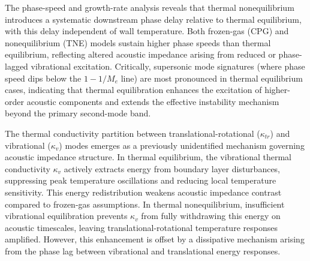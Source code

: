 The phase-speed and growth-rate analysis reveals that thermal nonequilibrium introduces a systematic downstream phase delay relative to thermal equilibrium, with this delay independent of wall temperature. Both frozen-gas (\gls{CPG}) and nonequilibrium (\gls{TNE}) models sustain higher phase speeds than thermal equilibrium, reflecting altered acoustic impedance arising from reduced or phase-lagged vibrational excitation. Critically, supersonic mode signatures (where phase speed dips below the $1 - 1/M_e$ line) are most pronounced in thermal equilibrium cases, indicating that thermal equilibration enhances the excitation of higher-order acoustic components and extends the effective instability mechanism beyond the primary second-mode band.

The thermal conductivity partition between translational-rotational ($\kappa_{tr}$) and vibrational ($\kappa_v$) modes emerges as a previously unidentified mechanism governing acoustic impedance structure. In thermal equilibrium, the vibrational thermal conductivity $\kappa_v$ actively extracts energy from boundary layer disturbances, suppressing peak temperature oscillations and reducing local temperature sensitivity. This energy redistribution weakens acoustic impedance contrast compared to frozen-gas assumptions. In thermal nonequilibrium, insufficient vibrational equilibration prevents $\kappa_v$ from fully withdrawing this energy on acoustic timescales, leaving translational-rotational temperature responses amplified. However, this enhancement is offset by a dissipative mechanism arising from the phase lag between vibrational and translational energy responses.


